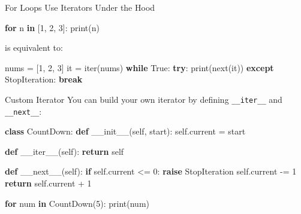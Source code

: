 \documentclass[
  letterpaper,
  DIV=11,
  numbers=noendperiod]{scrreprt}
\newenvironment{Shaded}{\begin{snugshade}}{\end{snugshade}}
\newcommand{\BuiltInTok}[1]{\textcolor[rgb]{0.00,0.23,0.31}{#1}}
\newcommand{\ControlFlowTok}[1]{\textcolor[rgb]{0.00,0.23,0.31}{\textbf{#1}}}
\newcommand{\DecValTok}[1]{\textcolor[rgb]{0.68,0.00,0.00}{#1}}
\newcommand{\FunctionTok}[1]{\textcolor[rgb]{0.28,0.35,0.67}{#1}}
\newcommand{\KeywordTok}[1]{\textcolor[rgb]{0.00,0.23,0.31}{\textbf{#1}}}
\newcommand{\NormalTok}[1]{\textcolor[rgb]{0.00,0.23,0.31}{#1}}
\newcommand{\OperatorTok}[1]{\textcolor[rgb]{0.37,0.37,0.37}{#1}}
\newcommand{\PreprocessorTok}[1]{\textcolor[rgb]{0.68,0.00,0.00}{#1}}
\newcommand{\VariableTok}[1]{\textcolor[rgb]{0.07,0.07,0.07}{#1}}
\begin{document}
For Loops Use Iterators Under the Hood

\begin{Shaded}
\begin{Highlighting}[]
\ControlFlowTok{for}\NormalTok{ n }\KeywordTok{in}\NormalTok{ [}\DecValTok{1}\NormalTok{, }\DecValTok{2}\NormalTok{, }\DecValTok{3}\NormalTok{]:}
    \BuiltInTok{print}\NormalTok{(n)}
\end{Highlighting}
\end{Shaded}

is equivalent to:

\begin{Shaded}
\begin{Highlighting}[]
\NormalTok{nums }\OperatorTok{=}\NormalTok{ [}\DecValTok{1}\NormalTok{, }\DecValTok{2}\NormalTok{, }\DecValTok{3}\NormalTok{]}
\NormalTok{it }\OperatorTok{=} \BuiltInTok{iter}\NormalTok{(nums)}
\ControlFlowTok{while} \VariableTok{True}\NormalTok{:}
    \ControlFlowTok{try}\NormalTok{:}
        \BuiltInTok{print}\NormalTok{(}\BuiltInTok{next}\NormalTok{(it))}
    \ControlFlowTok{except} \PreprocessorTok{StopIteration}\NormalTok{:}
        \ControlFlowTok{break}
\end{Highlighting}
\end{Shaded}

Custom Iterator You can build your own iterator by defining
\texttt{\_\_iter\_\_} and \texttt{\_\_next\_\_}:

\begin{Shaded}
\begin{Highlighting}[]
\KeywordTok{class}\NormalTok{ CountDown:}
    \KeywordTok{def} \FunctionTok{\_\_init\_\_}\NormalTok{(}\VariableTok{self}\NormalTok{, start):}
        \VariableTok{self}\NormalTok{.current }\OperatorTok{=}\NormalTok{ start}

    \KeywordTok{def} \FunctionTok{\_\_iter\_\_}\NormalTok{(}\VariableTok{self}\NormalTok{):}
        \ControlFlowTok{return} \VariableTok{self}

    \KeywordTok{def} \FunctionTok{\_\_next\_\_}\NormalTok{(}\VariableTok{self}\NormalTok{):}
        \ControlFlowTok{if} \VariableTok{self}\NormalTok{.current }\OperatorTok{\textless{}=} \DecValTok{0}\NormalTok{:}
            \ControlFlowTok{raise} \PreprocessorTok{StopIteration}
        \VariableTok{self}\NormalTok{.current }\OperatorTok{{-}=} \DecValTok{1}
        \ControlFlowTok{return} \VariableTok{self}\NormalTok{.current }\OperatorTok{+} \DecValTok{1}

\ControlFlowTok{for}\NormalTok{ num }\KeywordTok{in}\NormalTok{ CountDown(}\DecValTok{5}\NormalTok{):}
    \BuiltInTok{print}\NormalTok{(num)}
\end{Highlighting}
\end{Shaded}
\end{document}
